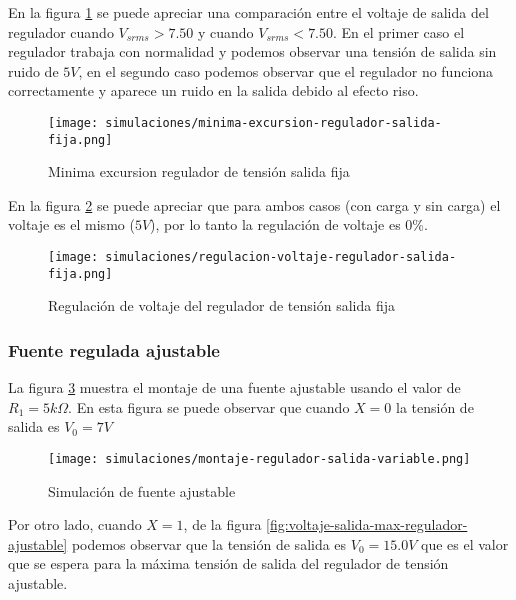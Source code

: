 En la figura \ref{fig:minima-excursion-regulador-salida-fija} se puede apreciar una comparación entre el voltaje de salida del regulador cuando $V_{srms} > 7.50$ y cuando $V_{srms} < 7.50$. En el primer caso el regulador trabaja con normalidad y podemos observar una tensión de salida sin ruido de $5V$, en el segundo caso podemos observar que el regulador no funciona correctamente y aparece un ruido en la salida debido al efecto riso.

\begin{figure}[ht]
    \centering
    \texttt{[image: simulaciones/minima-excursion-regulador-salida-fija.png]}
    \caption{Minima excursion regulador de tensión salida fija}
    \label{fig:minima-excursion-regulador-salida-fija}
\end{figure}

En la figura \ref{fig:regulacion-voltaje-regulador-salida-fija} se puede apreciar que para ambos casos (con carga y sin carga) el voltaje es el mismo ($5V$), por lo tanto la regulación de voltaje es 0\%.

\begin{figure}[ht]
    \centering
    \texttt{[image: simulaciones/regulacion-voltaje-regulador-salida-fija.png]}
    \caption{Regulación de voltaje del regulador de tensión salida fija}
    \label{fig:regulacion-voltaje-regulador-salida-fija}
\end{figure}

\FloatBarrier
\subsubsection{Fuente regulada ajustable}

La figura \ref{fig:simulacion-fuente-ajustable} muestra el montaje de una fuente ajustable usando el valor de $R_1 = 5k \Omega$. En esta figura se puede observar que cuando $X=0$ la tensión de salida es $V_0 = 7 V$

\begin{figure}[ht]
    \centering
    \texttt{[image: simulaciones/montaje-regulador-salida-variable.png]}
    \caption{Simulación de fuente ajustable}
    \label{fig:simulacion-fuente-ajustable}
\end{figure}

Por otro lado, cuando $X=1$, de la figura \ref{fig:voltaje-salida-max-regulador-ajustable} podemos observar que la tensión de salida es $V_0 = 15.0 V$ que es el valor que se espera para la máxima tensión de salida del regulador de tensión ajustable.


